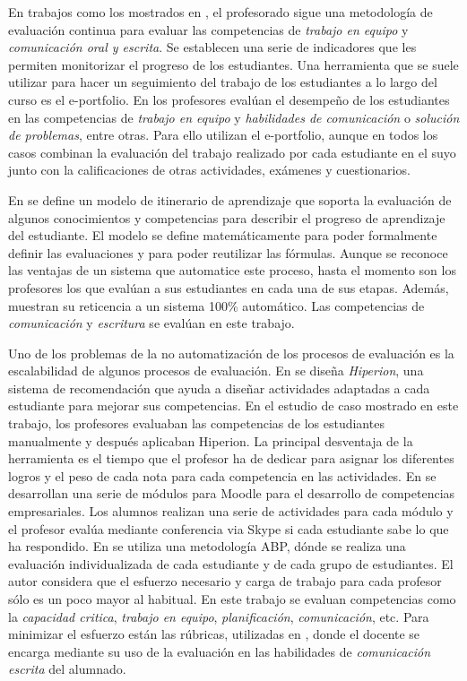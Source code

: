 En trabajos como los mostrados en \cite{martin2010new,prashar2010competence}, el profesorado sigue una metodología de evaluación continua para evaluar las competencias de \emph{trabajo en equipo} y \emph{comunicación oral y escrita}. Se establecen una serie de indicadores que les permiten monitorizar el progreso de los estudiantes. Una herramienta que se suele utilizar para hacer un seguimiento del trabajo de los estudiantes a lo largo del curso es el e-portfolio. En \cite{martin2013acquired,rodriguez2010portfolio,benlloch2007adapting} los profesores evalúan el desempeño de los estudiantes en las competencias de \emph{trabajo en equipo} y \emph{habilidades de comunicación} o \emph{solución de problemas}, entre otras. Para ello utilizan el e-portfolio, aunque en todos los casos combinan la evaluación del trabajo realizado por cada estudiante en el suyo junto con la calificaciones de otras actividades, exámenes y cuestionarios.

En \cite{yang2014fine} se define un modelo de itinerario de aprendizaje que soporta la evaluación de algunos conocimientos y competencias para describir el progreso de aprendizaje del estudiante. El modelo se define matemáticamente para poder formalmente definir las evaluaciones y para poder reutilizar las fórmulas. Aunque se reconoce las ventajas de un sistema que automatice este proceso, hasta el momento son los profesores los que evalúan a sus estudiantes en cada una de sus etapas. Además, muestran su reticencia a un sistema 100\% automático. Las competencias de \emph{comunicación} y \emph{escritura} se evalúan en este trabajo.

Uno de los problemas de la no automatización de los procesos de evaluación es la escalabilidad de algunos procesos de evaluación. En \cite{serrano2013hiperion} se diseña \emph{Hiperion}, una sistema de recomendación que ayuda a diseñar actividades adaptadas a cada estudiante para mejorar sus competencias. En el estudio de caso mostrado en este trabajo, los profesores evaluaban las competencias de los estudiantes manualmente y después aplicaban Hiperion. La principal desventaja de la herramienta es el tiempo que el profesor ha de dedicar para asignar los diferentes logros y el peso de cada nota para cada competencia en las actividades. En \cite{ward2011developing} se desarrollan una serie de módulos para Moodle para el desarrollo de competencias empresariales. Los alumnos realizan una serie de actividades para cada módulo y el profesor evalúa mediante conferencia via Skype si cada estudiante sabe lo que ha respondido. En \cite{lacuesta2009active} se utiliza una metodología ABP, dónde se realiza una evaluación individualizada de cada estudiante y de cada grupo de estudiantes. El autor considera que el esfuerzo necesario y carga de trabajo para cada profesor sólo es un poco mayor al habitual. En este trabajo se evaluan competencias como la \emph{capacidad critica}, \emph{trabajo en equipo}, \emph{planificación}, \emph{comunicación}, etc. Para minimizar el esfuerzo están las rúbricas, utilizadas en \cite{casan2015developing}, donde el docente se encarga mediante su uso de la evaluación en las habilidades de \emph{comunicación escrita} del alumnado.

